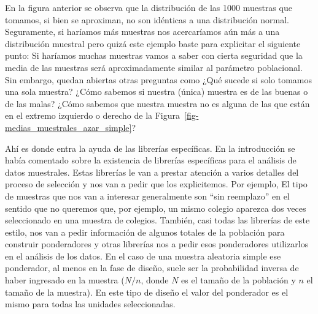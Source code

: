 \documentclass[
  spanish,
  a4paper,
]{scrreprt}
\begin{document}
En la figura anterior se observa que la distribución de las 1000
muestras que tomamos, si bien se aproximan, no son idénticas a una
distribución normal. Seguramente, si haríamos más muestras nos
acercaríamos aún más a una distribución muestral pero quizá este ejemplo
baste para explicitar el siguiente punto: Si haríamos muchas muestras
vamos a saber con cierta seguridad que la media de las muestras será
aproximadamente similar al parámetro poblacional. Sin embargo, quedan
abiertas otras preguntas como ¿Qué sucede si solo tomamos una sola
muestra? ¿Cómo sabemos si nuestra (única) muestra es de las buenas o de
las malas? ¿Cómo sabemos que nuestra muestra no es alguna de las que
están en el extremo izquierdo o derecho de la
Figura~\ref{fig-medias_muestrales_azar_simple}?

Ahí es donde entra la ayuda de las librerías específicas. En la
introducción se había comentado sobre la existencia de librerías
específicas para el análisis de datos muestrales. Estas librerías le van
a prestar atención a varios detalles del proceso de selección y nos van
a pedir que los explicitemos. Por ejemplo, El tipo de muestras que nos
van a interesar generalmente son ``sin reemplazo'' en el sentido que no
queremos que, por ejemplo, un mismo colegio aparezca dos veces
seleccionado en una muestra de colegios. También, casi todas las
librerías de este estilo, nos van a pedir información de algunos totales
de la población para construir ponderadores y otras librerías nos a
pedir esos ponderadores utilizarlos en el análisis de los datos. En el
caso de una muestra aleatoria simple ese ponderador, al menos en la fase
de diseño, suele ser la probabilidad inversa de haber ingresado en la
muestra (\(N/n\), donde \(N\) es el tamaño de la población y \(n\) el
tamaño de la muestra). En este tipo de diseño el valor del ponderador es
el mismo para todas las unidades seleccionadas.
\end{document}
